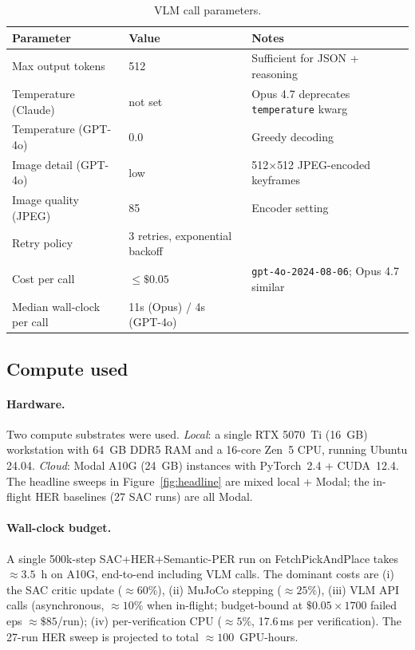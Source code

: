 \begin{table}[t]
\centering
\footnotesize
\caption{VLM call parameters.}
\label{tab:hparams-vlm}
\begin{tabular}{l l l}
\toprule
Parameter & Value & Notes \\
\midrule
Max output tokens & 512 & Sufficient for JSON + reasoning \\
Temperature (Claude) & not set & Opus 4.7 deprecates \texttt{temperature} kwarg \\
Temperature (GPT-4o) & 0.0 & Greedy decoding \\
Image detail (GPT-4o) & low & 512$\times$512 JPEG-encoded keyframes \\
Image quality (JPEG) & 85 & Encoder setting \\
Retry policy & 3 retries, exponential backoff & \\
Cost per call & $\le\!\$0.05$ & \texttt{gpt-4o-2024-08-06}; Opus 4.7 similar \\
Median wall-clock per call & 11s (Opus) / 4s (GPT-4o) & \\
\bottomrule
\end{tabular}
\end{table}

\subsection{Compute used}
\label{app:compute}

\paragraph{Hardware.}
Two compute substrates were used. \emph{Local}: a single RTX 5070~Ti
(16~GB) workstation with 64~GB DDR5 RAM and a 16-core Zen~5 CPU,
running Ubuntu 24.04. \emph{Cloud}: Modal A10G (24~GB) instances with
PyTorch~2.4 + CUDA~12.4. The headline sweeps in
Figure~\ref{fig:headline} are mixed local + Modal; the in-flight HER
baselines (27 SAC runs) are all Modal.

\paragraph{Wall-clock budget.}
A single 500k-step SAC+HER+Semantic-PER run on FetchPickAndPlace takes
$\approx 3.5$~h on A10G, end-to-end including VLM calls. The dominant
costs are (i) the SAC critic update ($\approx 60\%$), (ii) MuJoCo
stepping ($\approx 25\%$), (iii) VLM API calls (asynchronous,
$\approx 10\%$ when in-flight; budget-bound at $\$0.05\!\times\!1700$
failed eps $\approx \$85$/run); (iv) per-verification CPU
($\approx 5\%$, 17.6\,ms per verification). The 27-run HER sweep is
projected to total $\approx 100$~GPU-hours.

